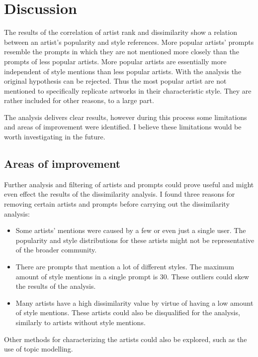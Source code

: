 \chapter{Discussion}
\label{cha:Discussion}

The results of the correlation of artist rank and dissimilarity show a relation between an artist's popularity and style references. More popular artists' prompts resemble the prompts in which they are not mentioned more closely than the prompts of less popular artists. More popular artists are essentially more independent of style mentions than less popular artists. With the analysis the original hypothesis can be rejected. Thus the most popular artist are not mentioned to specifically replicate artworks in their characteristic style. They are rather included for other reasons, to a large part.

The analysis delivers clear results, however during this process some limitations and areas of improvement were identified. I believe these limitations would be worth investigating in the future.


\section{Areas of improvement}

Further analysis and filtering of artists and prompts could prove useful and might even effect the results of the dissimilarity analysis. I found three reasons for removing certain artists and prompts before carrying out the dissimilarity analysis:

\begin{itemize}
    \item Some artists' mentions were caused by a few or even just a single user. The popularity and style distributions for these artists might not be representative of the broader community.
    \item There are prompts that mention a lot of different styles. The maximum amount of style mentions in a single prompt is 30. These outliers could skew the results of the analysis.
    \item Many artists have a high dissimilarity value by virtue of having a low amount of style mentions. These artists could also be disqualified for the analysis, similarly to artists without style mentions.
\end{itemize}

Other methods for characterizing the artists could also be explored, such as the use of topic modelling.




